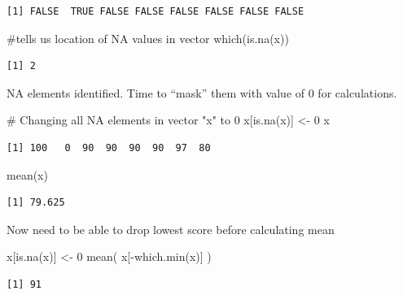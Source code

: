 \documentclass[
  letterpaper,
  DIV=11,
  numbers=noendperiod]{scrartcl}
\newenvironment{Shaded}{\begin{snugshade}}{\end{snugshade}}
\newcommand{\CommentTok}[1]{\textcolor[rgb]{0.37,0.37,0.37}{#1}}
\newcommand{\DecValTok}[1]{\textcolor[rgb]{0.68,0.00,0.00}{#1}}
\newcommand{\FunctionTok}[1]{\textcolor[rgb]{0.28,0.35,0.67}{#1}}
\newcommand{\NormalTok}[1]{\textcolor[rgb]{0.00,0.23,0.31}{#1}}
\newcommand{\OtherTok}[1]{\textcolor[rgb]{0.00,0.23,0.31}{#1}}
\newcommand{\SpecialCharTok}[1]{\textcolor[rgb]{0.37,0.37,0.37}{#1}}
\begin{document}
\begin{verbatim}
[1] FALSE  TRUE FALSE FALSE FALSE FALSE FALSE FALSE
\end{verbatim}

\begin{Shaded}
\begin{Highlighting}[]
\CommentTok{\#tells us location of NA values in vector}
\FunctionTok{which}\NormalTok{(}\FunctionTok{is.na}\NormalTok{(x))}
\end{Highlighting}
\end{Shaded}

\begin{verbatim}
[1] 2
\end{verbatim}

NA elements identified. Time to ``mask'' them with value of 0 for
calculations.

\begin{Shaded}
\begin{Highlighting}[]
\CommentTok{\# Changing all NA elements in vector "x" to 0}
\NormalTok{x[}\FunctionTok{is.na}\NormalTok{(x)] }\OtherTok{\textless{}{-}} \DecValTok{0}
\NormalTok{x}
\end{Highlighting}
\end{Shaded}

\begin{verbatim}
[1] 100   0  90  90  90  90  97  80
\end{verbatim}

\begin{Shaded}
\begin{Highlighting}[]
\FunctionTok{mean}\NormalTok{(x)}
\end{Highlighting}
\end{Shaded}

\begin{verbatim}
[1] 79.625
\end{verbatim}

Now need to be able to drop lowest score before calculating mean

\begin{Shaded}
\begin{Highlighting}[]
\NormalTok{x[}\FunctionTok{is.na}\NormalTok{(x)] }\OtherTok{\textless{}{-}} \DecValTok{0}
\FunctionTok{mean}\NormalTok{( x[}\SpecialCharTok{{-}}\FunctionTok{which.min}\NormalTok{(x)] )}
\end{Highlighting}
\end{Shaded}

\begin{verbatim}
[1] 91
\end{verbatim}
\end{document}
